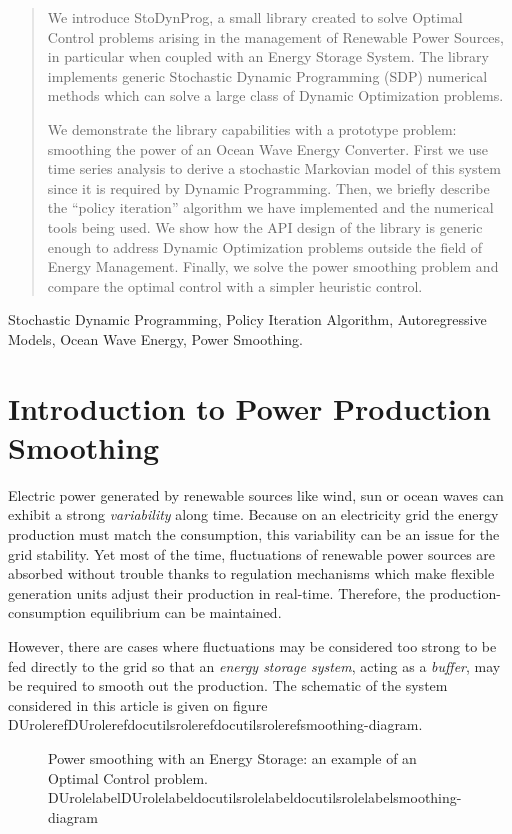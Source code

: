 \documentclass[letterpaper,compsoc,twoside]{IEEEtran}
\providecommand*{\DUrole}[2]{\ifcsname DUrole#1\endcsname \csname DUrole#1\endcsname{#2}\else \ifcsname docutilsrole#1\endcsname \csname docutilsrole#1\endcsname{#2}\else #2\fi \fi }
\begin{document}
\newcommand*{\docutilsroleref}{\ref}
\newcommand*{\docutilsrolelabel}{\label}
\AtEndDocument{\cleardoublepage}
\begin{abstract}We introduce StoDynProg, a small library created to solve Optimal
Control problems arising in the management of Renewable Power Sources,
in particular when coupled with an Energy Storage System. The library
implements generic Stochastic Dynamic Programming (SDP) numerical
methods which can solve a large class of Dynamic Optimization problems.

We demonstrate the library capabilities with a prototype problem:
smoothing the power of an Ocean Wave Energy Converter. First we use time
series analysis to derive a stochastic Markovian model of this system
since it is required by Dynamic Programming. Then, we briefly describe
the “policy iteration” algorithm we have implemented and the numerical
tools being used. We show how the API design of the library is generic
enough to address Dynamic Optimization problems outside the field of
Energy Management. Finally, we solve the power smoothing problem and
compare the optimal control with a simpler heuristic control.\end{abstract}\begin{IEEEkeywords}Stochastic Dynamic Programming, Policy Iteration Algorithm,
Autoregressive Models, Ocean Wave Energy, Power Smoothing.\end{IEEEkeywords}

\section{Introduction to Power Production Smoothing\label{introduction-to-power-production-smoothing}\label{s-intro-smoothing}}


Electric power generated by renewable
sources like wind, sun or ocean waves can exhibit a strong \emph{variability}
along time. Because on an electricity grid the energy production must
match the consumption, this variability can be an issue for the grid
stability. Yet most of the time, fluctuations of renewable power sources
are absorbed without trouble thanks to regulation mechanisms which make
flexible generation units adjust their production in real-time.
Therefore, the production-consumption equilibrium can be maintained.

However, there are cases where fluctuations may be considered too strong
to be fed directly to the grid so that an \emph{energy storage system},
acting as a \emph{buffer}, may be required to smooth out the production. The
schematic of the system considered in this article is given on figure
\DUrole{ref}{smoothing-diagram}.\begin{figure}[t]\noindent{}
\caption{Power smoothing with an Energy Storage: an example of an Optimal Control problem.
\DUrole{label}{smoothing-diagram}}
\end{figure}
\end{document}

